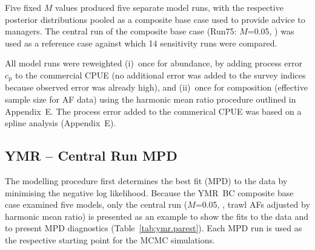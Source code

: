 \documentclass[11pt]{book}
\newcommand{\AppEqn}{Appendix~E}
\begin{document}
Five fixed $M$ values produced five separate model runs, with the respective posterior distributions pooled as a composite base case used to provide advice to managers.
The central run of the composite base case (Run75: $M$=0.05, ) was used as a reference case against which 14 sensitivity runs were compared.

All model runs were reweighted (i)~once for abundance, by adding process error $c_\text{p}$ to the commercial CPUE (no additional error was added to the survey indices because observed error was already high), and (ii)~once for composition (effective sample size for AF data) using the harmonic mean ratio procedure outlined in \AppEqn.
The process error added to the commerical CPUE was based on a spline analysis (\AppEqn).

\subsection{YMR -- Central Run MPD}


The modelling procedure first determines the best fit (MPD) to the data by minimising the negative log likelihood.
Because the YMR~BC composite base case examined five models, only the central run ($M$=0.05, , trawl AFs adjusted by harmonic mean ratio) is presented as an example to show the fits to the data and to present MPD diagnostics (Table~\ref{tab:ymr.parest}).
Each MPD run is used as the respective starting point for the MCMC simulations.
\end{document}
